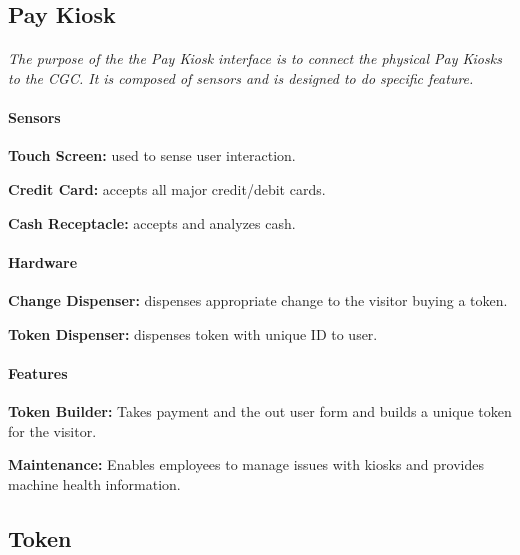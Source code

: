 \documentclass[12pt]{article}
\begin{document}
	\subsection{Pay Kiosk}
	\paragraph{} \textit{The purpose of the the Pay Kiosk interface is to connect 
	the physical Pay Kiosks to the CGC. It is composed of sensors and is designed 
	to do specific feature.}
			
	\paragraph{Sensors}
	\begin{list}{}{}
		\item \textbf{Touch Screen: }used to sense user interaction. 
		\item \textbf{Credit Card: }accepts all major credit/debit cards. 
		\item \textbf{Cash Receptacle: }accepts and analyzes cash. 
	\end{list}
		
	\paragraph{Hardware}
	\begin{list}{}{}
		\item \textbf{Change Dispenser:} dispenses appropriate change to the 
		visitor buying a token.
		\item \textbf{Token Dispenser: } dispenses token with unique ID to user.
	\end{list}

	\paragraph{Features}
	\begin{list}{}{}
		\item \textbf{Token Builder:} Takes payment and the out user form and builds
		a unique token for the visitor.
		\item \textbf{Maintenance: } Enables employees to manage issues with kiosks 
		and provides machine health information. 
	\end{list}

	\subsection{Token}
\end{document}
